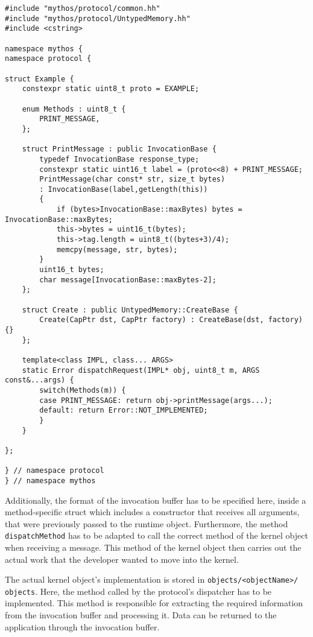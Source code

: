 \lstset{language=c++,caption=Object's Protocol Definition,label=lst:obj-protocol}
\begin{lstlisting}
#include "mythos/protocol/common.hh"
#include "mythos/protocol/UntypedMemory.hh"
#include <cstring>

namespace mythos {
namespace protocol {

struct Example {
	constexpr static uint8_t proto = EXAMPLE;

	enum Methods : uint8_t {
		PRINT_MESSAGE,
	};

	struct PrintMessage : public InvocationBase {
		typedef InvocationBase response_type;
		constexpr static uint16_t label = (proto<<8) + PRINT_MESSAGE;
		PrintMessage(char const* str, size_t bytes)
		: InvocationBase(label,getLength(this))
		{
			if (bytes>InvocationBase::maxBytes) bytes = InvocationBase::maxBytes;
			this->bytes = uint16_t(bytes);
			this->tag.length = uint8_t((bytes+3)/4);
			memcpy(message, str, bytes);
		}
		uint16_t bytes;
		char message[InvocationBase::maxBytes-2];
	};

	struct Create : public UntypedMemory::CreateBase {
		Create(CapPtr dst, CapPtr factory) : CreateBase(dst, factory) {}
	};

	template<class IMPL, class... ARGS>
	static Error dispatchRequest(IMPL* obj, uint8_t m, ARGS const&...args) {
		switch(Methods(m)) {
		case PRINT_MESSAGE: return obj->printMessage(args...);
		default: return Error::NOT_IMPLEMENTED;
		}
	}

};

} // namespace protocol
} // namespace mythos
\end{lstlisting}


Additionally, the format of the invocation buffer has to be specified here,
inside a method-specific struct which includes a constructor that receives all
arguments, that were previously passed to the runtime object.  Furthermore, the
method \texttt{dispatchMethod} has to be adapted to call the correct method of
the kernel object when receiving a message. This method of the kernel object
then carries out the actual work that the developer wanted to move into the
kernel.

The actual kernel object's implementation is stored in
\texttt{objects/<objectName>/\\objects}. Here, the method called by the
protocol's dispatcher has to be implemented. This method is responsible for
extracting the required information from the invocation buffer and processing
it. Data can be returned to the application through the invocation buffer.

% 
% 


